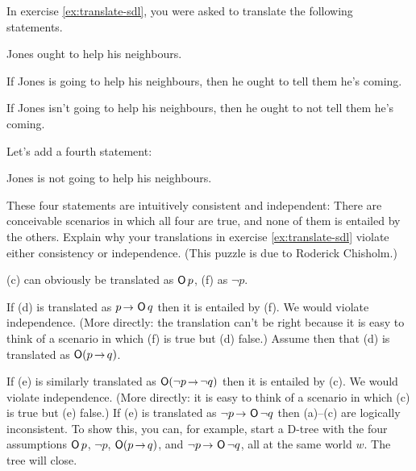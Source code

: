 \begin{exercise}\label{ex:chisholmsparadox}
  In exercise \ref{ex:translate-sdl}, you were asked to translate the following
  statements.
  \begin{exlist}
    \item[(c)] Jones ought to help his neighbours.
    \item[(d)] If Jones is going to help his neighbours, then he ought to tell them
    he's coming.
    \item[(e)] If Jones isn't going to help his neighbours, then he ought to not  tell them he's coming.
  \end{exlist}
  \medskip\noindent%
  Let's add a fourth statement:
  \begin{exlist}
    \item[(f)] Jones is not going to help his neighbours.
  \end{exlist}
  \medskip\noindent%
  These four statements are intuitively consistent and independent: There are
  conceivable scenarios in which all four are true, and none of them is entailed
  by the others. Explain why your translations in exercise
  \ref{ex:translate-sdl} violate either consistency or independence. (This puzzle is due to Roderick Chisholm.)
\end{exercise}
\begin{solution}
  (c) can obviously be translated as $\operatorname{\mathsf{O}} p$, (f) as $\neg p$.
  
  If (d) is translated as $p \to \Ob q$ then it is entailed by (f). We would
  violate independence. (More directly: the translation can't be right because
  it is easy to think of a scenario in which (f) is true but (d) false.) Assume
  then that (d) is translated as $\Ob(p \to q)$.

  If (e) is similarly translated as $\Ob(\neg p \to \neg q)$ then it is entailed
  by (c). We would violate independence. (More directly: it is easy to think of
  a scenario in which (c) is true but (e) false.) If (e) is translated as
  $\neg p \to \Ob \neg q$ then (a)--(c) are logically inconsistent. To show
  this, you can, for example, start a D-tree with the four assumptions $\operatorname{\mathsf{O}} p$,
  $\neg p$, $\Ob(p \to q)$, and $\neg p \to \Ob \neg q$, all at the same world
  $w$. The tree will close.
\end{solution}

